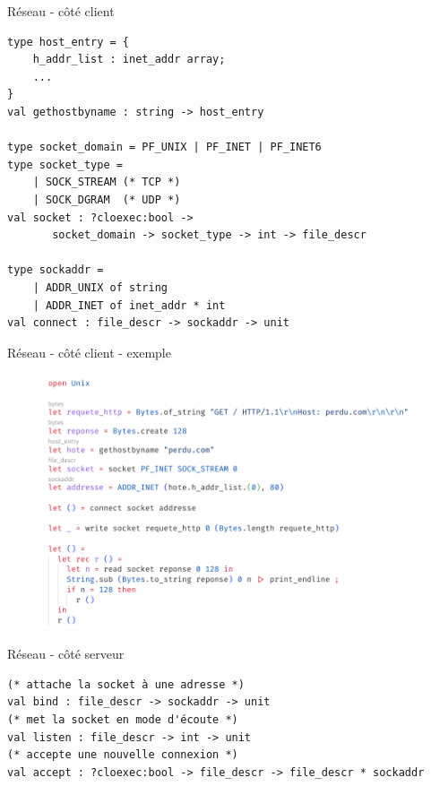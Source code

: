 
\begin{frame}[fragile]{Réseau - côté client}

\begin{lstlisting}
type host_entry = {
	h_addr_list : inet_addr array;
    ...
}
val gethostbyname : string -> host_entry

type socket_domain = PF_UNIX | PF_INET | PF_INET6
type socket_type = 
    | SOCK_STREAM (* TCP *) 
    | SOCK_DGRAM  (* UDP *)
val socket : ?cloexec:bool ->
       socket_domain -> socket_type -> int -> file_descr

type sockaddr = 
    | ADDR_UNIX of string
    | ADDR_INET of inet_addr * int
val connect : file_descr -> sockaddr -> unit
\end{lstlisting}

\end{frame}

\begin{frame}[fragile]{Réseau - côté client - exemple}

\begin{figure}
    \centering
    \includegraphics[width=\textwidth]{slides/images/unixsocket.png}
\end{figure}
    
\end{frame}

\begin{frame}[fragile]{Réseau - côté serveur}

\begin{lstlisting}
(* attache la socket à une adresse *)
val bind : file_descr -> sockaddr -> unit
(* met la socket en mode d'écoute *)
val listen : file_descr -> int -> unit
(* accepte une nouvelle connexion *)
val accept : ?cloexec:bool -> file_descr -> file_descr * sockaddr
\end{lstlisting}

\end{frame}